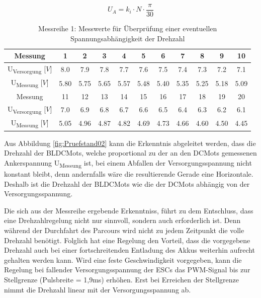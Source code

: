 \begin{equation}\label{eq4.1}
U_A = k_i \cdot N \cdot \frac{\pi}{30}
\end{equation}

\begin{table}[H]
\begin{tabular}{|c|c|c|c|c|c|c|c|c|c|c|}
\hline
\rule{0pt}{15pt} Messung & 1&2&3&4&5&6&7&8&9&10 \\
\hline
U\textsubscript{Versorgung} [$V$]&8.0&7.9&7.8&7.7&7.6&7.5&7.4&7.3&7.2&7.1 \\ 
\hline
U\textsubscript{Messung} [$V$]&5.80&5.75&5.65&5.57&5.48&5.40&5.35&5.25&5.18&5.09 \\
\hline
\hline
\rule{0pt}{15pt} Messung & 11&12&13&14&15&16&17&18&19&20 \\
\hline
U\textsubscript{Versorgung} [$V$]&7.0&6.9&6.8&6.7&6.6&6.5&6.4&6.3&6.2&6.1 \\ 
\hline
U\textsubscript{Messung} [$V$]&5.05&4.96&4.87&4.82&4.69&4.73&4.66&4.60&4.50&4.45 \\
\hline
\end{tabular}
\centering
\captionsetup{width=.95\textwidth}
\caption[Messreihe 1: Spannungsabhängigkeit Drehzahl]{Messreihe 1: Messwerte für Überprüfung einer eventuellen Spannungsabhängigkeit der Drehzahl}\centering
\label{tab:PruefstandMess01}
\end{table}

Aus Abbildung \ref{fig:Pruefstand02} kann die Erkenntnis abgeleitet werden, dass die Drehzahl der \acp{BLDCMot}, welche proportional zu der an den \acp{DCMot} gemessenen Ankerspannung U\textsubscript{Messung} ist, bei einem Abfallen der Versorgungsspannung nicht konstant bleibt, denn andernfalls wäre die resultierende Gerade eine Horizontale. Deshalb ist die Drehzahl der \acp{BLDCMot} wie die der \acp{DCMot} abhängig von der Versorgungsspannung.\vspace{11pt}

Die sich aus der Messreihe ergebende Erkenntniss, führt zu dem Entschluss, dass eine Drehzahlregelung nicht nur sinnvoll, sondern auch erforderlich ist. Denn während der Durchfahrt des Parcours wird nicht zu jedem Zeitpunkt die volle Drehzahl benötigt. Folglich hat eine Regelung den Vorteil, dass die vorgegebene Drehzahl auch bei einer fortschreitenden Entladung des Akkus weiterhin aufrecht gehalten werden kann. Wird eine feste Geschwindigkeit vorgegeben, kann die Regelung bei fallender Versorgungsspannung der \acp{ESC} das \ac{PWM}-Signal bis zur Stellgrenze (Pulsbreite = 1,9ms) erhöhen. Erst bei Erreichen der Stellgrenze nimmt die Drehzahl linear mit der Versorgungsspannung ab.

